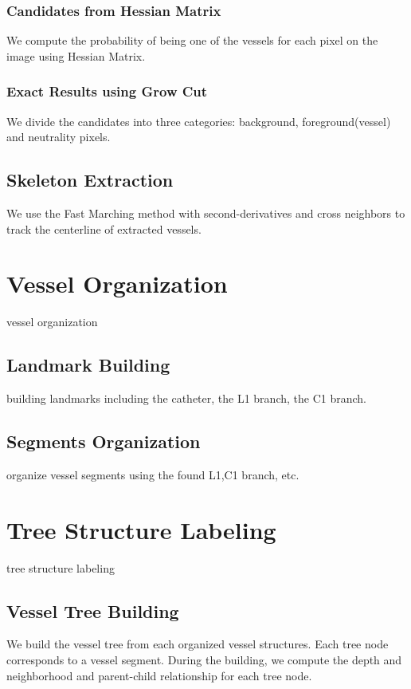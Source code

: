 \documentclass[journal]{IEEEtran}
\begin{document}
\subsubsection{Candidates from Hessian Matrix}
\label{subsubsec:hessian}
We compute the probability of being one of the vessels for each pixel on the image using Hessian Matrix.
\subsubsection{Exact Results using Grow Cut}
\label{subsubsec:growcut}
We divide the candidates into three categories: background, foreground(vessel) and neutrality pixels.

\subsection{Skeleton Extraction}
\label{subsec:skeleton-extraction}
We use the Fast Marching method with second-derivatives and cross neighbors to track the centerline of extracted vessels.

\section{Vessel Organization}
\label{sec:vessel-organization}
vessel organization
\subsection{Landmark Building}
building landmarks including the catheter, the L1 branch, the C1 branch.
\subsection{Segments Organization}
organize vessel segments using the found L1,C1 branch, etc.

\section{Tree Structure Labeling}
\label{sec:tree-labeling}
tree structure labeling
\subsection{Vessel Tree Building}
We build the vessel tree from each organized vessel structures. Each tree node corresponds to a vessel segment. During the building, we compute the depth and neighborhood and parent-child relationship for each tree node.
\end{document}
